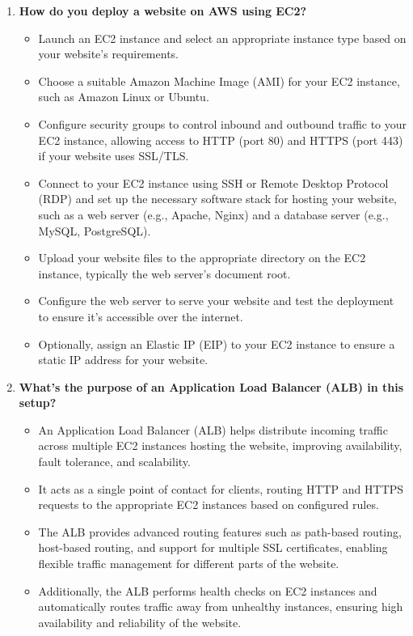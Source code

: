 \documentclass[11pt]{article}
\begin{document}
\begin{enumerate}
    \item \textbf{How do you deploy a website on AWS using EC2?}
          \begin{itemize}
              \item Launch an EC2 instance and select an appropriate instance type based on your website's requirements.
              \item Choose a suitable Amazon Machine Image (AMI) for your EC2 instance, such as Amazon Linux or Ubuntu.
              \item Configure security groups to control inbound and outbound traffic to your EC2 instance, allowing access to HTTP (port 80) and HTTPS (port 443) if your website uses SSL/TLS.
              \item Connect to your EC2 instance using SSH or Remote Desktop Protocol (RDP) and set up the necessary software stack for hosting your website, such as a web server (e.g., Apache, Nginx) and a database server (e.g., MySQL, PostgreSQL).
              \item Upload your website files to the appropriate directory on the EC2 instance, typically the web server's document root.
              \item Configure the web server to serve your website and test the deployment to ensure it's accessible over the internet.
              \item Optionally, assign an Elastic IP (EIP) to your EC2 instance to ensure a static IP address for your website.
          \end{itemize}

    \item \textbf{What's the purpose of an Application Load Balancer (ALB) in this setup?}
          \begin{itemize}
              \item An Application Load Balancer (ALB) helps distribute incoming traffic across multiple EC2 instances hosting the website, improving availability, fault tolerance, and scalability.
              \item It acts as a single point of contact for clients, routing HTTP and HTTPS requests to the appropriate EC2 instances based on configured rules.
              \item The ALB provides advanced routing features such as path-based routing, host-based routing, and support for multiple SSL certificates, enabling flexible traffic management for different parts of the website.
              \item Additionally, the ALB performs health checks on EC2 instances and automatically routes traffic away from unhealthy instances, ensuring high availability and reliability of the website.
          \end{itemize}


\end{enumerate}
\end{document}
